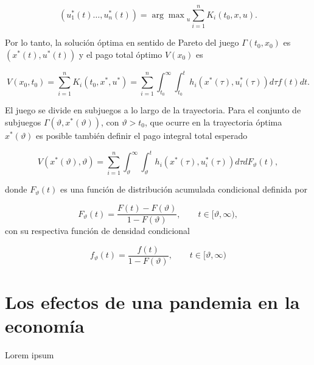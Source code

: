 \begin{equation}
	(u_1^*(t)\dots,u_n^*(t)) = {\arg\max}_u \sum_{i=1}^nK_i(t_0,x,u).
\end{equation}

Por lo tanto, la solución óptima en sentido de Pareto del juego $\Gamma(t_0,x_0)$ es $(x^*(t), u^*(t))$ y el pago total óptimo $V(x_0)$ es

\begin{equation}
	V(x_0, t_0) = \sum_{i=1}^n K_i(t_0,x^*,u^*) = \sum_{i=1}^n \int_{t_0}^\infty \int_{t_0}^t h_i(x^*(\tau), u_i^*(\tau))d\tau f(t)dt.
\end{equation}

El juego se divide en subjuegos a lo largo de la trayectoria. Para el conjunto de subjuegos $\Gamma(\vartheta, x^*(\vartheta))$, con $\vartheta > t_0$, que ocurre en la trayectoria óptima $x^*(\vartheta)$ es posible también definir el pago integral total esperado 

\begin{equation}
	V(x^*(\vartheta), \vartheta) = \sum_{i=1}^n \int_{\vartheta}^\infty \int_{\vartheta}^t h_i(x^*(\tau), u_i^*(\tau))d\tau dF_\vartheta(t),
\end{equation}

donde $F_\vartheta(t)$ es una función de distribución acumulada condicional definida por

\begin{equation}
	F_\vartheta(t) = \frac{F(t) - F(\vartheta)}{1 - F(\vartheta)}, \qquad t \in [\vartheta, \infty),
\end{equation}
con su respectiva función de densidad condicional

\begin{equation}
	f_\vartheta(t) = \frac{f(t)}{1 - F(\vartheta)}, \qquad t \in [\vartheta, \infty)
\end{equation}


\section{Los efectos de una pandemia en la economía}

Lorem ipsum
